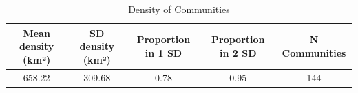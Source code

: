 \begin{table}

\caption{Density of Communities}
\centering
\begin{tabular}[t]{c|c|c|c|c}
\hline
Mean density (km²) & SD density (km²) & Proportion in 1 SD & Proportion in 2 SD & N Communities\\
\hline
658.22 & 309.68 & 0.78 & 0.95 & 144\\
\hline
\end{tabular}
\end{table}

